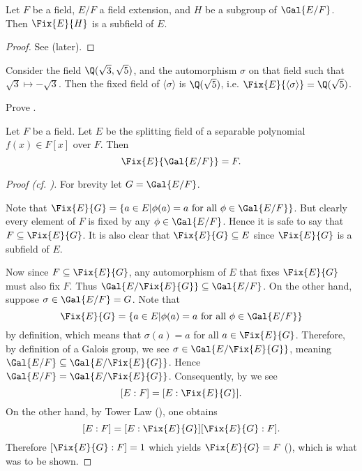 \begin{proposition}\label{prop-fixed-field-is-subfield}
    Let $F$ be a field, $E/F$ a field extension, and $H$ be a subgroup of $\Gal{E/F}$. Then $\Fix{E}{H}$ is a subfield of $E$.
\end{proposition}
\begin{proof}
    See  (later).
\end{proof}

\begin{example}
    Consider the field $\Q(\sqrt3,\sqrt5)$, and the automorphism $\sigma$ on that field such that $\sqrt3 \mapsto -\sqrt3$. Then the fixed field of $\langle\sigma\rangle$ is $\Q(\sqrt5)$, i.e. $\Fix{E}{\langle\sigma\rangle} = \Q(\sqrt5)$.
\end{example}

\begin{exercise}\label{exercise-fixed-field-is-subfield}
    Prove .
\end{exercise}

\begin{proposition}\label{prop-fixed-field-of-Gal-E/F-is-F}
    Let $F$ be a field. Let $E$ be the splitting field of a separable polynomial $f(x) \in F[x]$ over $F$. Then
    \[
        \Fix{E}{\Gal{E/F}} = F.
    \]
\end{proposition}
\begin{proof}[Proof (cf. {\cite[Proposition 23.17]{judson_beezer_2022}})]
    For brevity let $G = \Gal{E/F}$.
    
    Note that $\Fix{E}{G} = \{a \in E \vert \phi(a) = a \text{ for all } \phi \in \Gal{E/F}\}$. But clearly every element of $F$ is fixed by any $\phi \in \Gal{E/F}$. Hence it is safe to say that $F \subseteq \Fix{E}{G}$. It is also clear that $\Fix{E}{G} \subseteq E$ since $\Fix{E}{G}$ is a subfield of $E$.

    Now since $F \subseteq \Fix{E}{G}$, any automorphism of $E$ that fixes $\Fix{E}{G}$ must also fix $F$. Thus $\Gal{E/\Fix{E}{G}} \subseteq \Gal{E/F}$. On the other hand, suppose $\sigma \in \Gal{E/F} = G$. Note that
    \[
        \Fix{E}{G} = \{a \in E \vert \phi(a) = a \text{ for all } \phi \in \Gal{E/F}\}
    \]
    by definition, which means that $\sigma(a) = a$ for all $a \in \Fix{E}{G}$. Therefore, by definition of a Galois group, we see $\sigma \in \Gal{E/\Fix{E}{G}}$, meaning $\Gal{E/F} \subseteq \Gal{E/\Fix{E}{G}}$. Hence $\Gal{E/F} = \Gal{E/\Fix{E}{G}}$. Consequently, by  we see
    \[
        [E:F] = [E:\Fix{E}{G}].
    \]
    On the other hand, by Tower Law (), one obtains
    \[
        [E:F] = [E:\Fix{E}{G}][\Fix{E}{G}:F].
    \]
    Therefore $[\Fix{E}{G}:F] = 1$ which yields $\Fix{E}{G} = F$ (), which is what was to be shown.
\end{proof}

